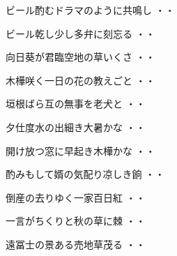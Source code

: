 \begin{shiika}ビール酌むドラマのように共鳴し
\hfill{・・}\end{shiika}
\vspace{0.6cm}
\begin{shiika}ビール乾し少し多弁に刻忘る
\hfill{・・}\end{shiika}
\vspace{0.6cm}
\begin{shiika}向日葵が君臨空地の草いくさ
\hfill{・・}\end{shiika}
\vspace{0.6cm}
\begin{shiika}木樺咲く一日の花の教えごと
\hfill{・・}\end{shiika}
\vspace{0.6cm}
\begin{shiika}垣根ばら互の無事を老犬と
\hfill{・・}\end{shiika}
\vspace{0.6cm}
\begin{shiika}夕仕度水の出細き大暑かな
\hfill{・・}\end{shiika}
\vspace{0.6cm}
\begin{shiika}開け放つ窓に早起き木樺かな
\hfill{・・}\end{shiika}
\vspace{0.6cm}
\begin{shiika}酌みもして婿の気配り凉しき餉
\hfill{・・}\end{shiika}
\vspace{0.6cm}
\begin{shiika}倒産の去りゆく一家百日紅
\hfill{・・}\end{shiika}
\vspace{0.6cm}
\begin{shiika}一言がちくりと秋の草に棘
\hfill{・・}\end{shiika}
\vspace{0.6cm}
\begin{shiika}遠冨士の景ある売地草茂る
\hfill{・・}\end{shiika}
\vspace{0.6cm}

